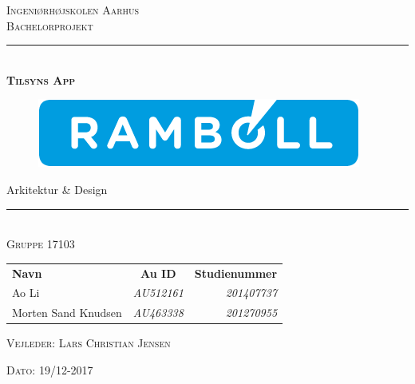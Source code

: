 \newcommand{\HRule}{\rule{\linewidth}{0.1mm}} %
\thispagestyle{empty}
\begin{center}
	\vspace{3cm}
	\textsc{\LARGE Ingeniørhøjskolen Aarhus}\\[1.5cm] %
	
	\textsc{\large Bachelorprojekt}\\[2.5 cm] 
	
	\HRule \\[0.8cm]
	{\huge \bfseries \textsc{Tilsyns App}} 
		\begin{figure}[h!]
		\centering
		\includegraphics[width=0.7\linewidth]{Forside/Logo}
	\end{figure}

	{\LARGE Arkitektur \& Design} \\[0.4cm]
	\HRule \\[1.5cm]
	
	\textsc{\large Gruppe 17103}\\
	\vspace{0.5 in}
	\begin{center}
		\begin{tabular}{l c r}
			\textbf{Navn} & \textbf{Au ID} & \textbf{Studienummer} \\
			Ao Li & \textsl{AU512161} & \textsl{201407737}    \\
			Morten Sand Knudsen & \textsl{AU463338} & \textsl{201270955}  \\
		\end{tabular}
	\end{center}
	\vspace{0.5 in}
	
	\textsc{\large Vejleder: Lars Christian Jensen}
	\vspace{0.5 in}
	
	\textsc{\large Dato: 19/12-2017}\\
	\vfill %
	
\end{center} %

\clearpage

\newpage